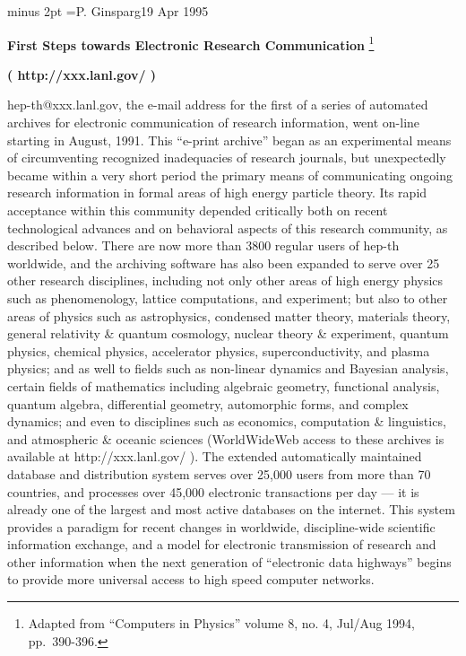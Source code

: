 \baselineskip14pt minus 2pt
\headline={P. Ginsparg\hfil 19 Apr 1995}

\centerline{{\bf First Steps towards Electronic Research Communication}
\footnote*{Adapted from ``Computers in Physics''
volume 8, no. 4, Jul/Aug 1994, pp.~390-396.}}
\centerline{{\bf( http://xxx.lanl.gov/ )}}

\bigskip

hep-th@xxx.lanl.gov, the e-mail address for the first of a series of automated
archives for electronic communication of research information, went on-line
starting in August, 1991. This ``e-print archive'' began as an experimental
means of circumventing recognized inadequacies of research journals, but
unexpectedly became within a very short period the primary means of
communicating ongoing research information in formal areas of high energy
particle theory. Its rapid acceptance within this community depended critically
both on recent technological advances and on behavioral aspects of this
research community, as described below. There are now more than 3800 regular
users of hep-th worldwide, and the archiving software has also been expanded to
serve over 25 other research disciplines, including not only other areas
of high energy physics such as phenomenology, lattice computations, and
experiment; but also to other areas of physics such as
astrophysics, condensed matter theory, materials theory,
general relativity \& quantum cosmology, nuclear theory \& experiment,
quantum physics, chemical physics, accelerator physics,
superconductivity, and plasma physics; and as well to fields such as
non-linear dynamics and Bayesian analysis, certain fields of mathematics
including algebraic geometry, functional analysis, quantum algebra,
differential geometry, automorphic forms, and complex dynamics; and even
to disciplines such as economics, computation \& linguistics, and
atmospheric \& oceanic sciences
(WorldWideWeb access to these archives is available
at http://xxx.lanl.gov/ ). The extended
automatically maintained database and distribution system serves over 25,000
users from more than 70 countries, and processes over 45,000 electronic
transactions per day
--- it is already one of the largest and most active databases on the internet.
This system provides a paradigm for recent changes in worldwide,
discipline-wide scientific information exchange, and a model for electronic
transmission of research and other information when the next generation of
``electronic data highways'' begins to provide more universal access to high
speed computer networks.

